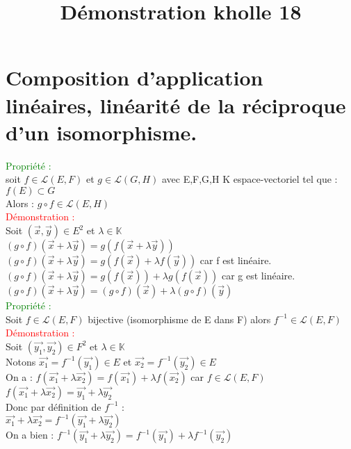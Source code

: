 \documentclass{article}
\begin{document}
\title{Démonstration kholle 18}
\date{}
\maketitle
	\renewcommand{\thesection}{\Roman{section}}
	\setlength{\parindent}{1.5cm}
\section{Composition d'application linéaires, linéarité de la réciproque d'un isomorphisme.}
\textcolor{green}{Propriété :} \\ 
soit $f \in \mathcal{L}(E,F)$ et $g \in \mathcal{L}(G,H)$ avec E,F,G,H K espace-vectoriel tel que : $f(E) \subset G$ \\ 
Alors : $g \circ f \in \mathcal{L} (E,H)$ \\ 
\textcolor{red}{Démonstration :}  \\ 
Soit $(\vec{x}, \vec{y}) \in E^2$ et $\lambda \in \mathbb{K}$ \\ 
$(g \circ f) (\vec{x}+ \lambda \vec{y})=g(f(\vec{x}+ \lambda \vec{y}))$ \\ 
$(g \circ f) (\vec{x}+ \lambda \vec{y})=g(f(\vec{x}) + \lambda f(\vec{y}))$ car f est linéaire. \\
$(g \circ f) (\vec{x}+ \lambda \vec{y})=g(f(\vec{x})) + \lambda g(f(\vec{x}))$ car g est linéaire. \\ 
$(g \circ f) (\vec{x}+ \lambda \vec{y})=(g \circ f)(\vec{x})+ \lambda (g \circ f)(\vec{y})$ \\ 
\textcolor{green}{Propriété :} \\
Soit $f \in \mathcal{L}(E,F)$ bijective (isomorphisme de E dans F) alors $f^{-1} \in \mathcal{L}(E,F)$ \\ 
\textcolor{red}{Démonstration :} \\
Soit $(\vec{y_1}, \vec{y_2}) \in F^2$ et $\lambda \in \mathbb{K}$ \\ 
Notons $\vec{x_1}=f^{-1}(\vec{y_1}) \in E$ et $\vec{x_2}=f^{-1}(\vec{y_2}) \in E$ \\ 
On a : $f(\vec{x_1}+ \lambda \vec{x_2})=f(\vec{x_1})+ \lambda f(\vec{x_2})$ car $f \in \mathcal{L}(E,F)$ \\ 
$f(\vec{x_1}+ \lambda \vec{x_2})= \vec{y_1} + \lambda \vec{y_2}$ \\ 
Donc par définition de $f^{-1}$ : \\ 
$\vec{x_1}+ \lambda \vec{x_2}= f^{-1}(\vec{y_1}+ \lambda \vec{y_2})$ \\ 
On a bien : $f^{-1}(\vec{y_1}+ \lambda \vec{y_2})= f^{-1}(\vec{y_1})+ \lambda f^{-1}(\vec{y_2})$
\end{document}
